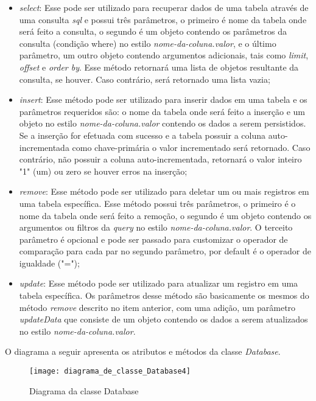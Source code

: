 \begin{itemize}
	\item \textit{select}: Esse pode ser utilizado para recuperar dados de uma tabela através de uma consulta \textit{sql} e possui três parâmetros, o primeiro é nome da tabela onde será feito a consulta, o segundo é um objeto contendo os parâmetros da consulta (condição where) no estilo  \textit{nome-da-coluna.valor}, e o último parâmetro, um outro objeto contendo argumentos adicionais, tais como \textit{limit}, \textit{offset} e \textit{order by}. Esse método retornará uma lista de objetos resultante da consulta, se houver. Caso contrário, será retornado uma lista vazia;

	\item \textit{insert}: Esse método pode ser utilizado para inserir dados em uma tabela e os parâmetros requeridos são: o nome da tabela onde será feito a inserção e um objeto no estilo \textit{nome-da-coluna.valor} contendo os dados a serem persistidos. Se a inserção for efetuada com sucesso e a tabela possuir a coluna auto-incrementada como chave-primária o valor incrementado será retornado. Caso contrário, não possuir a coluna auto-incrementada, retornará o valor inteiro "1" (um) ou zero se houver erros na inserção;

	\item \textit{remove}: Esse método pode ser utilizado para deletar um ou mais registros em uma tabela específica. Esse método possui três parâmetros, o primeiro é o nome da tabela onde será feito a remoção, o segundo é um objeto contendo os argumentos ou filtros da \textit{query} no estilo \textit{nome-da-coluna.valor}. O terceito parâmetro é opcional e pode ser passado para customizar o operador de comparação para cada par no segundo parâmetro, por default é o operador de igualdade ("=");

	\item \textit{update}: Esse método pode ser utilizado para atualizar um registro em uma tabela específica. Os parâmetros desse método são basicamente os mesmos do método \textit{remove} descrito no item anterior, com uma adição, um parâmetro \textit{updateData} que consiste de um objeto contendo os dados a serem atualizados no estilo \textit{nome-da-coluna.valor}.
\end{itemize}

 O diagrama a seguir apresenta os atributos e métodos da classe \textit{Database}.
\begin{figure}[h]
	\texttt{[image: diagrama\_de\_classe\_Database4]}
	\centering
	\caption{Diagrama da classe Database}
\end{figure}


